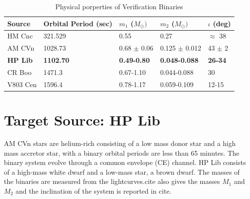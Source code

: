 \documentclass[12pt,a4paper,oneside]{book}
\begin{document}
\begin{table}[!htb]
\centering
\begin{tabular}{|l|l|l|l|l|}
\hline
Source                                 & Orbital Period (sec)                    & $m_1$ ($M_{\odot})$                       & $m_2$ ($M_{\odot})$                         & $\iota$ (deg)                         \\ \hline
HM Cnc                                 & 321.529                                 & 0.55                                      & 0.27                                        & $\approx$ 38             \\ \hline
AM CVn                                 & 1028.73                                 & 0.68 $\pm$ 0.06              & 0.125
$\pm$ 0.012              & 43 $\pm$ 2                 \\ \hline
{\color[HTML]{FE0000} \textbf{HP Lib}} & {\color[HTML]{FE0000} \textbf{1102.70}} & {\color[HTML]{FE0000} \textbf{0.49-0.80}} & {\color[HTML]{FE0000} \textbf{0.048-0.088}} & {\color[HTML]{FE0000} \textbf{26-34}} \\ \hline
CR Boo                                 & 1471.3                                  & 0.67-1.10                                 & 0.044-0.088                                 & 30                                    \\ \hline
V803 Cen                               & 1596.4                                  & 0.78-1.17                                 & 0.059-0.109                                 & 12-15                                 \\ \hline
\end{tabular}
\caption{Physical porperties of Verification Binaries}
\end{table}








\section*{Target Source: HP Lib}

AM CVn stars are helium-rich consisting of a low mass donor star and a high mass accretor star, with a binary orbital periods are less than 65 minutes. The binary system evolve through a common envelope (CE) channel. HP Lib consists of a high-mass white dwarf and a low-mass star, a brown dwarf. The masses of the binaries are measured from the lightcurves.cite  also gives the masses $M_{1}$ and $M_{2}$ and the inclination of the system is reported in cite.
\end{document}
